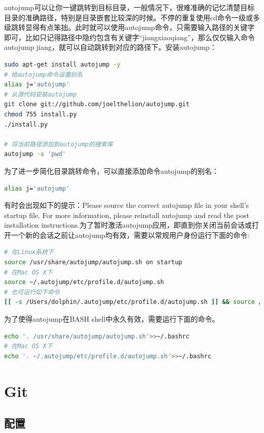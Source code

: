 \documentclass[letter]{book}
\begin{document}
autojump可以让你一键跳转到目标目录，一般情况下，很难准确的记忆清楚目标目录的准确路径，特别是目录嵌套比较深的时候。不停的重复使用cd命令一级或多级跳转显得有点笨拙。此时就可以使用autojump命令，只需要输入路径的关键字即可，比如只记得路径中隐约包含有关键字“jiangxiaoqiang”，那么仅仅输入命令autojump jiang，就可以自动跳转到对应的路径下。安装autojump：

\begin{lstlisting}[language=Bash]
sudo apt-get install autojump -y
# 给autojump命令设置别名
alias j='autojump'
# 从源代码安装autojump
git clone git://github.com/joelthelion/autojump.git
chmod 755 install.py
./install.py

# 将当前路径添加到autojump的搜索库
autojump -a 'pwd'
\end{lstlisting}

为了进一步简化目录跳转命令，可以直接添加命令autojump的别名：

\begin{lstlisting}[language=Bash]
alias j='autojump'
\end{lstlisting}

有时会出现如下的提示：Please source the correct autojump file in your shell's startup file. For more information, please reinstall autojump and read the post installation instructions.为了暂时激活autojump应用，即直到你关闭当前会话或打开一个新的会话之前让autojump均有效，需要以常规用户身份运行下面的命令:

\begin{lstlisting}[language=Bash]
# 在Linux系统下
source /usr/share/autojump/autojump.sh on startup
# 在Mac OS X下
source ~/.autojump/etc/profile.d/autojump.sh
# 也可运行如下命令
[[ -s /Users/dolphin/.autojump/etc/profile.d/autojump.sh ]] && source /Users/dolphin/.autojump/etc/profile.d/autojump.sh
\end{lstlisting}

为了使得autojump在BASH shell中永久有效，需要运行下面的命令。

\begin{lstlisting}[language=Bash]
echo '. /usr/share/autojump/autojump.sh'>>~/.bashrc
# 在Mac OS X下
echo '. ~/.autojump/etc/profile.d/autojump.sh'>>~/.bashrc
\end{lstlisting}

\section{Git}

\subsection{配置}
\end{document}

